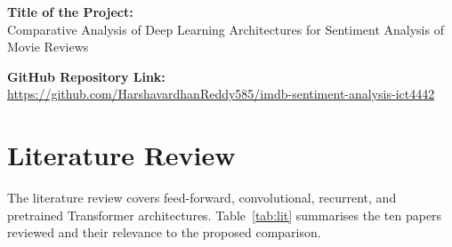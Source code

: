 \documentclass[10pt,a4paper]{article}
\begin{document}
\vspace{0.5cm}
\noindent\textbf{Title of the Project:}\\[4pt]
Comparative Analysis of Deep Learning Architectures for Sentiment Analysis of Movie Reviews

\vspace{0.5cm}
\noindent\textbf{GitHub Repository Link:}\\[4pt]
\url{https://github.com/HarshavardhanReddy585/imdb-sentiment-analysis-ict4442}

\section{Literature Review}
The literature review covers feed-forward, convolutional, recurrent, and pretrained Transformer architectures. Table~\ref{tab:lit} summarises the ten papers reviewed and their relevance to the proposed comparison.
\end{document}
